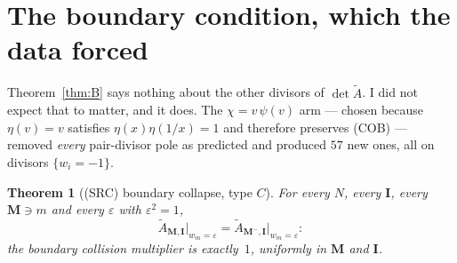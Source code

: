 \documentclass[11pt]{article}
\theoremstyle{plain}
\newtheorem{thm}{Theorem}
\theoremstyle{definition}
\theoremstyle{remark}
\theoremstyle{plain}
\newcommand{\bI}{\mathbf{I}}
\newcommand{\bM}{\mathbf{M}}
\newcommand{\At}{\widetilde{A}}
\begin{document}
\section{The boundary condition, which the data forced}
\label{sec:short}

Theorem~\ref{thm:B} says nothing about the other divisors of $\det\At$.  I did not
expect that to matter, and it does.  The $\chi=v\,\psi(v)$ arm --- chosen because
$\eta(v)=v$ satisfies $\eta(x)\eta(1/x)=1$ and therefore preserves (COB) --- removed
\emph{every} pair-divisor pole as predicted and produced $57$ new ones, all on
divisors $\{w_i=-1\}$.

\begin{thm}[(SRC) boundary collapse, type $C$]\label{thm:SRC}
For every $N$, every $\bI$, every $\bM\ni m$ and every $\varepsilon$ with
$\varepsilon^2=1$,
\[
  \At_{\bM,\bI}\big|_{w_m=\varepsilon}=\At_{\bM^{-},\bI}\big|_{w_m=\varepsilon}:
\]
the boundary collision multiplier is exactly~$1$, uniformly in $\bM$ and $\bI$.
\end{thm}
\end{document}
